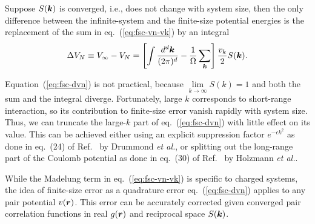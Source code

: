 Suppose $S(\boldsymbol{k})$ is converged, i.e., does not change with system size, then the only difference between the infinite-system and the finite-size potential energies is the replacement of the sum in eq.~(\ref{eq:fsc-vn-vk}) by an integral
\begin{align} \label{eq:fsc-dvn}
\Delta V_N \equiv V_{\infty} - V_N = \left[
\int \dfrac{d^d\boldsymbol{k}}{(2\pi)^d} - \dfrac{1}{\Omega}\sum\limits_{\boldsymbol{k}}
\right] \frac{v_k}{2} S(\boldsymbol{k}).
\end{align}

Equation~(\ref{eq:fsc-dvn}) is not practical, because $\lim\limits_{k\rightarrow\infty}S(k)=1$ and both the sum and the integral diverge. Fortunately, large $k$ corresponds to short-range interaction, so its contribution to finite-size error vanish rapidly with system size. Thus, we can truncate the large-$k$ part of eq.~(\ref{eq:fsc-dvn}) with little effect on its value. This can be achieved either using an explicit suppression factor $e^{-\epsilon k^2}$ as done in eq.~(24) of Ref.~\cite{Drummond2008} by Drummond \textit{et al.}, or splitting out the long-range part of the Coulomb potential as done in eq.~(30) of Ref.~\cite{Holzmann2016} by Holzmann \textit{et al.}.

While the Madelung term in eq.~(\ref{eq:fsc-vn-vk}) is specific to charged systems, the idea of finite-size error as a quadrature error eq.~(\ref{eq:fsc-dvn}) applies to any pair potential $v(\boldsymbol{r})$. This error can be accurately corrected given converged pair correlation functions in real $g(\boldsymbol{r})$ and reciprocal space $S(\boldsymbol{k})$.

